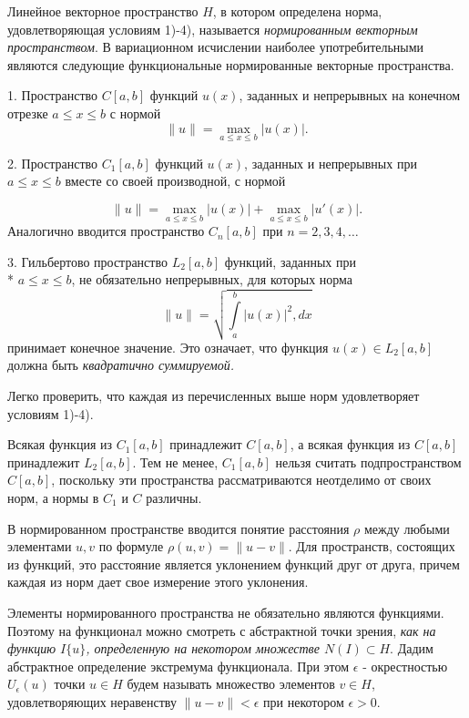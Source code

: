 Линейное векторное пространство $H$, в котором определена норма, удовлетворяющая условиям 1)-4), называется {\it нормированным векторным пространством}. В вариационном исчислении наиболее употребительными являются следующие функциональные нормированные векторные пространства.

	1. Пространство $C[a, b]$ функций $u(x)$, заданных и непрерывных на конечном отрезке $a\le x \le b$ с нормой
$$\|u\|= \max_{a\le x\le b}|u(x)|.$$
	\vspace*{-\baselineskip}

	2. Пространство $C_1[a, b]$ функций $u(x)$, заданных и непрерывных при $a\le x \le b$ вместе со своей производной, с нормой

	\newpage
	\noindent
	$$\|u\|= \max_{a\le x\le b}|u(x)| + \max_{a\le x\le b}|u'(x)|.$$
	Аналогично вводится пространство $C_n[a,b]$ при $n=2,3,4,\dots$

	3. Гильбертово пространство $L_2[a,b]$ функций, заданных при \\* $a\le x\le b$,
	не обязательно непрерывных, для которых норма
	$$\textstyle \|u\|=\sqrt{\int\limits_a^b |u(x)|^2, dx}$$
	принимает конечное значение. Это означает, что функция $u(x)\in L_2[a,b]$
	должна быть {\it квадратично суммируемой.}

	Легко проверить, что каждая из перечисленных выше норм удовлетворяет условиям 1)-4).

	Всякая функция из $C_1[a, b]$ принадлежит $C[a, b]$, а всякая функция из $C[a, b]$ принадлежит $L_2[a, b]$. Тем не менее, $C_1[a, b]$ нельзя считать подпространством $C[a, b]$, поскольку эти пространства рассматриваются неотделимо от своих норм, а нормы в $C_1$ и $C$ различны.

	В нормированном пространстве вводится понятие расстояния $\rho$ между любыми элементами $u, v$ по формуле $\rho (u, v)=\|u-v\|$. Для пространств, состоящих из функций, это расстояние является уклонением функций друг от друга, причем каждая из норм дает свое измерение этого уклонения.

	Элементы нормированного пространства не обязательно являются функциями. Поэтому на функционал можно смотреть с абстрактной точки зрения, {\it как на функцию $I\{u\}$, определенную на некотором множестве $N(I)\subset H$}. Дадим абстрактное определение экстремума функционала. При этом $\epsilon$ - окрестностью $U_\epsilon (u)$ точки
	$u\in H$ будем называть множество элементов $v\in H$, удовлетворяющих неравенству
	$\|u-v\| < \epsilon$ при некотором $\epsilon > 0$.


